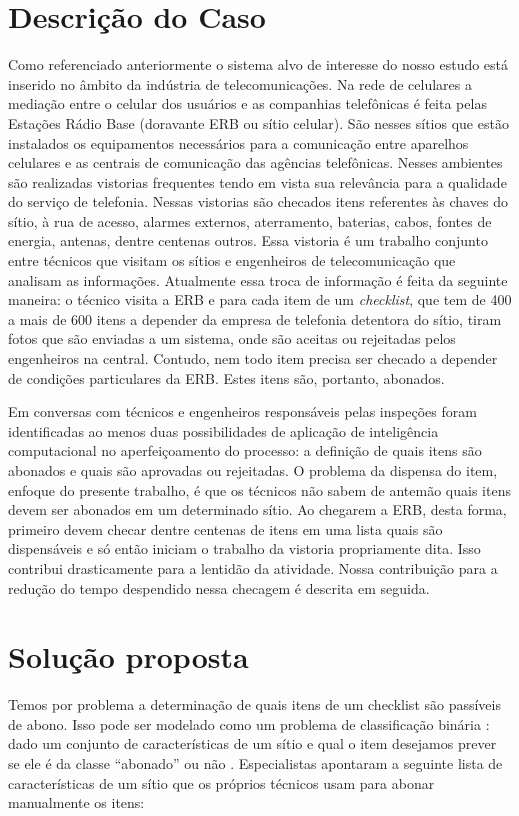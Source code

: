 \documentclass[
	12pt,				%
	openany,			%
	oneside,			%
	a4paper,			%
	english,			%
	french,				%
	spanish,			%
	brazil,				%
	]{abntex2}
\begin{document}
\chapter[Descrição do Caso]{Descrição do Caso}
Como referenciado anteriormente o sistema alvo de interesse do nosso estudo está
inserido no âmbito da indústria de telecomunicações. Na rede de celulares a
mediação entre o celular dos usuários e as companhias telefônicas é feita pelas
Estações Rádio Base (doravante ERB ou sítio celular). São nesses sítios que
estão instalados os equipamentos necessários para a comunicação entre aparelhos
celulares e as centrais de comunicação das agências telefônicas. Nesses
ambientes são realizadas vistorias frequentes tendo em vista sua relevância para
a qualidade do serviço de telefonia. Nessas vistorias são checados itens
referentes às chaves do sítio, à rua de acesso, alarmes externos, aterramento,
baterias, cabos, fontes de energia, antenas, dentre centenas outros. Essa
vistoria é um trabalho conjunto entre técnicos que visitam os sítios e
engenheiros de telecomunicação que analisam as informações. Atualmente essa
troca de informação é feita da seguinte maneira: o técnico visita a ERB e para
cada item de um \textit{checklist}, que tem de 400 a mais de 600 itens a
depender da empresa de telefonia detentora do sítio, tiram fotos que são
enviadas a um sistema, onde são aceitas ou rejeitadas pelos engenheiros na
central. Contudo, nem todo item precisa ser checado a depender de condições
particulares da ERB. Estes itens são, portanto, abonados.

Em conversas com técnicos e engenheiros responsáveis pelas inspeções foram
identificadas ao menos duas possibilidades de aplicação de inteligência
computacional no aperfeiçoamento do processo: a definição de quais itens são
abonados e quais são aprovadas ou rejeitadas. O problema da dispensa do item, enfoque do presente trabalho, é que os técnicos não sabem de antemão quais itens devem ser abonados em um determinado sítio. Ao chegarem a ERB, desta forma, primeiro devem checar dentre centenas de itens em uma lista quais são dispensáveis e só então iniciam o trabalho da vistoria propriamente dita. Isso contribui drasticamente para a lentidão da atividade. Nossa contribuição para a redução do tempo despendido nessa checagem é descrita em seguida.

\chapter[Solução proposta]{Solução proposta}
Temos por problema a determinação de quais itens de um checklist são passíveis
de abono. Isso pode ser modelado como um problema de classificação binária :
dado um conjunto de características de um sítio e qual o item desejamos prever
se ele é da classe ``abonado'' ou não \cite{james2013introduction}. Especialistas apontaram a seguinte lista de características de um sítio que os próprios técnicos usam para abonar manualmente os itens:
\end{document}
